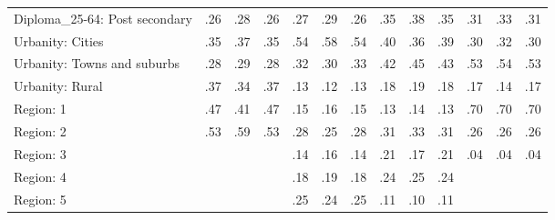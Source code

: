 \begin{tabular}[t]{lcccccccccccc}
Diploma\_25-64: Post secondary & .26 & .28 & .26 & .27 & .29 & .26 & .35 & .38 & .35 & .31 & .33 & .31\\
\addlinespace
Urbanity: Cities & .35 & .37 & .35 & .54 & .58 & .54 & .40 & .36 & .39 & .30 & .32 & .30\\
Urbanity: Towns and suburbs & .28 & .29 & .28 & .32 & .30 & .33 & .42 & .45 & .43 & .53 & .54 & .53\\
Urbanity: Rural & .37 & .34 & .37 & .13 & .12 & .13 & .18 & .19 & .18 & .17 & .14 & .17\\
\addlinespace
Region: 1 & .47 & .41 & .47 & .15 & .16 & .15 & .13 & .14 & .13 & .70 & .70 & .70\\
Region: 2 & .53 & .59 & .53 & .28 & .25 & .28 & .31 & .33 & .31 & .26 & .26 & .26\\
Region: 3 &  &  &  & .14 & .16 & .14 & .21 & .17 & .21 & .04 & .04 & .04\\
Region: 4 &  &  &  & .18 & .19 & .18 & .24 & .25 & .24 &  &  & \\
Region: 5 &  &  &  & .25 & .24 & .25 & .11 & .10 & .11 &  &  & \\
\bottomrule
\end{tabular}